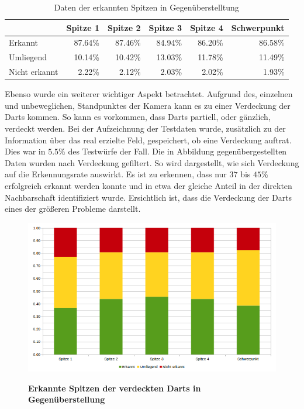\begin{table}[htbp]
\caption{Daten der erkannten Spitzen in Gegenüberstelltung}
\begin{tabular}{|l|r|r|r|r|r|}
\hline
 & \multicolumn{1}{l|}{Spitze 1} & \multicolumn{1}{l|}{Spitze 2} & \multicolumn{1}{l|}{Spitze 3} & \multicolumn{1}{l|}{Spitze 4} & \multicolumn{1}{l|}{Schwerpunkt} \\ \hline
Erkannt & 87.64\% & 87.46\% & 84.94\% & 86.20\% & 86.58\% \\ \hline
Umliegend & 10.14\% & 10.42\% & 13.03\% & 11.78\% & 11.49\% \\ \hline
Nicht erkannt & 2.22\% & 2.12\% & 2.03\% & 2.02\% & 1.93\% \\ \hline
\end{tabular}
\label{Tab:plaindata}
\end{table}

Ebenso wurde ein weiterer wichtiger Aspekt betrachtet. Aufgrund des, einzelnen und unbeweglichen, Standpunktes der Kamera kann es zu einer Verdeckung der Darts kommen. So kann es vorkommen, dass Darts partiell, oder gänzlich, verdeckt werden. Bei der Aufzeichnung der Testdaten wurde, zusätzlich zu der Information über das real erzielte Feld, gespeichert, ob eine Verdeckung auftrat. Dies war in $5.5\%$ des Testwürfe der Fall.
Die in Abbildung  gegenübergestellten Daten wurden nach Verdeckung gefiltert. So wird dargestellt, wie sich Verdeckung auf die Erkennungsrate auswirkt. Es ist zu erkennen, dass nur $37$ bis $45\%$ erfolgreich erkannt werden konnte und in etwa der gleiche Anteil in der direkten Nachbarschaft identifiziert wurde. 
Ersichtlich ist, dass die Verdeckung der Darts eines der größeren Probleme darstellt.

\begin{figure}[ht]
\centering
\includegraphics[width=\textwidth]{media/chartonlycovert}\\
\caption{\textbf{Erkannte Spitzen der verdeckten Darts in Gegenüberstellung}}
\label{Fig:chartcovert}
\end{figure}

